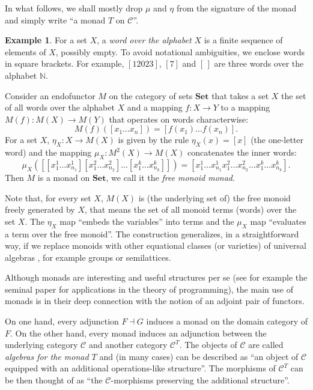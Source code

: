 \documentclass[reqno,A4paper]{amsart}
\newcommand{\C}{\mathcal{C}}
\newcommand{\Set}{\mathbf{Set}}
\newcommand{\isleftadjoint}{\dashv}
\theoremstyle{definition}
\newtheorem{example}[theorem]{Example}
\numberwithin{equation}{section}
\begin{document}
In what follows, we shall mostly drop $\mu$ and $\eta$ from the signature of the monad
and simply write ``a monad $T$ on $\C$''.

\begin{example}
\label{ex:monoidmonad}
For a set $X$, a {\em word over the alphabet $X$} is
a finite sequence of elements of $X$, possibly empty. To avoid
notational ambiguities, we enclose words in square brackets.
For example, $[12023]$, $[7]$ and $[\,]$ are three words over the alphabet $\mathbb N$.

Consider an endofunctor $M$ on the category of sets $\Set$ that takes a set $X$
the set of all words over the alphabet $X$ and a mapping
$f:X\to Y$ to a mapping $M(f):M(X)\to M(Y)$ that operates on words characterwise:
$$
M(f)([x_1\dots x_n])=[f(x_1)\dots f(x_n)].
$$
For a set $X$, $\eta_X:X\to M(X)$ is given by the rule $\eta_X(x)=[x]$ (the 
one-letter word) and the mapping $\mu_X:M^2(X)\to M(X)$ concatenates the
inner words:
$$
\mu_X([[x_1^1\dots x_{n_1}^1][x_1^2\dots x_{n_2}^2]\dots[x_1^k\dots x_{n_k}^k]])=
[x_1^1\dots x_{n_1}^1 x_1^2\dots x_{n_2}^2 \dots x_1^k\dots x_{n_k}^k].
$$
Then $M$ is a monad on $\Set$, we call it the {\em free monoid monad}.
\end{example}

Note that, for every set $X$, $M(X)$ is (the underlying set of) the free monoid
freely generated by $X$, that means the set of all monoid terms (words) over
the set $X$. The $\eta_X$ map ``embeds the variables'' into terms and the
$\mu_X$ map ``evaluates a term over the free monoid''. The construction
generalizes, in a straightforward way, if we replace monoids with other
equational classes (or varieties) of universal algebras
\cite{Gra:UA}, for example groups or semilattices. 

Although monads are interesting and useful structures per se 
(see for example the seminal paper \cite{moggi1991notions} for applications in the theory
of programming), the main use of monads is in their
deep connection with the notion of an adjoint pair of functors.

On one hand, every adjunction $F\isleftadjoint G$ induces a monad on the domain
category of $F$. On the other hand,
every monad induces an adjunction between the underlying category $\C$ and another category
$\C^T$. The objects of $\C$ are called {\em algebras for
the monad $T$} and (in many cases) can be described as ``an object of $\C$
equipped with an additional operations-like structure''. The morphisms of $\C^T$ can be then thought of as
``the $\C$-morphisms preserving the additional structure''.
\end{document}
